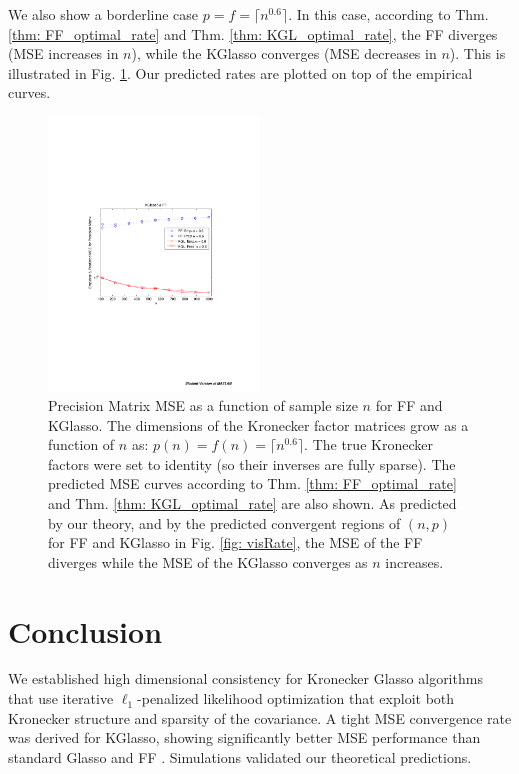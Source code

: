\documentclass[journal,11pt,draftcls,onecolumn]{IEEEtran}
\begin{document}
We also show a borderline case $p=f=\lceil n^{0.6} \rceil$. In this case, according to Thm. \ref{thm: FF_optimal_rate} and Thm. \ref{thm: KGL_optimal_rate}, the FF diverges (MSE increases in $n$), while the KGlasso converges (MSE decreases in $n$). This is illustrated in Fig. \ref{fig: KGlasso_FF_div_conv}. Our predicted rates are plotted on top of the empirical curves.
\begin{figure}[htp]
	\centering
		\includegraphics[width=0.50\textwidth]{./Sim/KGlasso_FF_sim_20-Mar-2012-22-54_inv_KGL_FF_pred.pdf}
	\caption{ Precision Matrix MSE as a function of sample size $n$ for FF and KGlasso. The dimensions of the Kronecker factor matrices grow as a function of $n$ as: $p(n)=f(n)=\lceil n^{0.6} \rceil$. The true Kronecker factors were set to identity (so their inverses are fully sparse). The predicted MSE curves according to Thm. \ref{thm: FF_optimal_rate} and Thm. \ref{thm: KGL_optimal_rate} are also shown. As predicted by our theory, and by the predicted convergent regions of $(n,p)$ for FF and KGlasso in Fig. \ref{fig: visRate},  the MSE of the FF diverges while the MSE of the KGlasso converges as $n$ increases. }
	\label{fig: KGlasso_FF_div_conv}
\end{figure}




\section{Conclusion}
We established high dimensional consistency for Kronecker Glasso algorithms that use iterative $\ell_1$-penalized likelihood optimization that exploit both Kronecker structure and sparsity of the covariance. A tight MSE convergence rate was derived for KGlasso, showing significantly better MSE performance than standard Glasso \cite{Rothman, ModelSel} and FF \cite{EstCovMatKron}. Simulations validated our theoretical predictions. 
\end{document}
